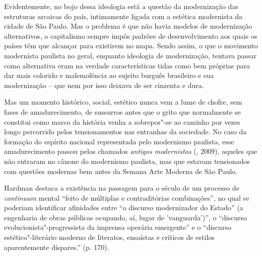 Evidentemente, no bojo dessa ideologia está a questão da modernização
das estruturas arcaicas do país, intimamente ligada com a estética
modernista da cidade de São Paulo. Mas o problema é que não havia
modelos de modernização alternativos, o capitalismo sempre impôs padrões
de desenvolvimento aos quais os países têm que alcançar para existirem
no mapa. Sendo assim, o que o movimento modernista paulista no geral,
enquanto ideologia de modernização, tentava passar como alternativa eram
na verdade características tidas como bem próprias para dar mais
colorido e malemolência ao sujeito burguês brasileiro e sua modernização
-- que nem por isso deixava de ser cinzenta e dura.

Mas um momento histórico, social, estético nunca vem a lume de chofre,
sem fases de amadurecimento, de sussurros antes que o grito que
normalmente se constitui como marco da história venha a sobrepor"-se ao
caminho por vezes longo percorrido pelos tensionamentos nas entranhas da
sociedade. No caso da formação do espírito nacional representada pelo
modernismo paulista, esse amadurecimento passou pelos chamados
\emph{antigos modernistas} (, 2009), aqueles que não entraram no
cânone do modernismo paulista, mas que estavam tensionados com questões
modernas bem antes da Semana Arte Moderna de São Paulo.

Hardman destaca a existência na passagem para o século  de um processo
de \emph{continuum} mental ``feito de múltiplas e contraditórias
combinações'', no qual se poderiam identificar afinidades entre ``o
discurso modernizador do Estado'' (a engenharia de obras públicas
ocupando, aí, lugar de 'vanguarda')'', o ``discurso
evolucionista"-progressista da imprensa operária emergente'' e o
``discurso estético"-literário moderno de literatos, ensaístas e críticos
de estilos aparentemente díspares.'' (p. 170).

